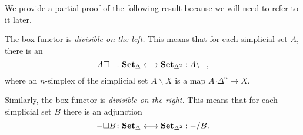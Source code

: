 \documentclass[main.tex]{subfiles}
\begin{document}
We provide a partial proof of the following result because we will need to refer to it later.
\begin{proposition}
  \label{prop:bijection_exhibiting_box_divisibility}
  The box functor is \emph{divisible on the left.} This means that for each simplicial set $A$, there is an
  \begin{equation*}
    A \square -\colon \mathbf{Set}_{\Delta} \longleftrightarrow \mathbf{Set}_{\Delta^{2}} : A \backslash -,
  \end{equation*}
  where an $n$-simplex of the simplicial set $A \backslash X$ is a map $A \square \Delta^{n} \to X$.

  Similarly, the box functor is \emph{divisible on the right.} This means that for each simplicial set $B$ there is an adjunction
  \begin{equation*}
    - \square B\colon \mathbf{Set}_{\Delta} \longleftrightarrow \mathbf{Set}_{\Delta^{2}} : - / B.
  \end{equation*}
\end{proposition}
\end{document}
